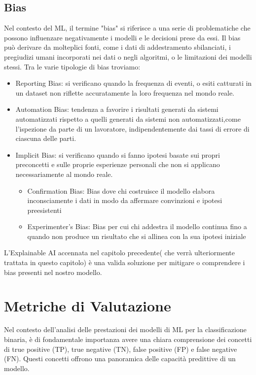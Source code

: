 \begin{flushleft}
\subsection{Bias}
Nel contesto del ML, il termine "bias" si riferisce a una serie di problematiche che possono influenzare negativamente i modelli e le decisioni prese da essi. 
Il bias può derivare da molteplici fonti, come i dati di addestramento sbilanciati, i pregiudizi umani incorporati nei dati o negli algoritmi, o le limitazioni dei modelli stessi.
Tra le varie tipologie di bias troviamo\cite{biasgoogle}:
\begin{itemize}
    \item Reporting Bias:  si verificano quando la frequenza di eventi, o esiti catturati in un dataset non riflette accuratamente la loro frequenza nel mondo reale.
    \item Automation Bias: tendenza a favorire i risultati generati da sistemi automatizzati rispetto a quelli generati da sistemi non automatizzati,come l'ispezione da parte di un lavoratore, indipendentemente dai tassi di errore di ciascuna delle parti.
    \item Implicit Bias: si verificano quando si fanno ipotesi basate sui propri preconcetti e sulle proprie esperienze personali che non si applicano necessariamente al mondo reale.
    \begin{itemize}
        \item Confirmation Bias: Bias dove chi costruisce il modello elabora inconsciamente i dati in modo da affermare convinzioni e ipotesi preesistenti
        \item Experimenter's Bias: Bias per cui chi addestra il modello continua fino a quando non produce un risultato che si allinea con la sua ipotesi iniziale 
    \end{itemize}
\end{itemize}

L'Explainable AI accennata nel capitolo precedente( che verrà ulteriormente trattata in questo capitolo) è una valida soluzione per mitigare o comprendere i bias presenti nel nostro modello.  

\section{Metriche di Valutazione}


Nel contesto dell'analisi delle prestazioni dei modelli di ML per la classificazione binaria, è di fondamentale importanza avere una chiara comprensione dei concetti di true positive (TP), true negative (TN), false positive (FP) e false negative (FN). Questi concetti 
offrono una panoramica delle capacità predittive di un modello.


\end{flushleft}
